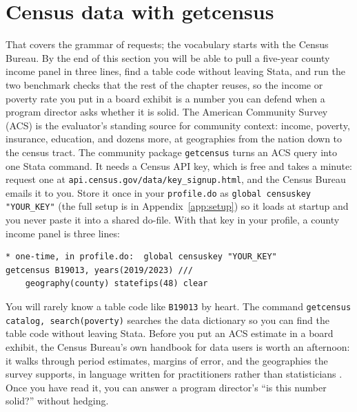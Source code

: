 \documentclass[
    a4paper,
    fontsize=10pt,
    twoside=true,
    numbers=noenddot,
]{kaobook}
\begin{document}
\section{Census data with getcensus}
That covers the grammar of requests; the vocabulary starts with the Census Bureau. By the end of this section you will be able to pull a five-year county income panel in three lines, find a table code without leaving Stata, and run the two benchmark checks that the rest of the chapter reuses, so the income or poverty rate you put in a board exhibit is a number you can defend when a program director asks whether it is solid. The American Community Survey (ACS) is the evaluator's standing source for community context: income, poverty, insurance, education, and dozens more, at geographies from the nation down to the census tract. The community package \texttt{getcensus} turns an ACS query into one Stata command. It needs a Census API key, which is free and takes a minute: request one at \texttt{api.census.gov/data/key\_signup.html}, and the Census Bureau emails it to you. Store it once in your \texttt{profile.do} as \texttt{global censuskey "YOUR\_KEY"} (the full setup is in Appendix~\ref{app:setup}) so it loads at startup and you never paste it into a shared do-file. With that key in your profile, a county income panel is three lines:
\par
{\footnotesize
\begin{verbatim}
* one-time, in profile.do:  global censuskey "YOUR_KEY"
getcensus B19013, years(2019/2023) ///
    geography(county) statefips(48) clear
\end{verbatim}
}
You will rarely know a table code like \texttt{B19013} by heart. The command \texttt{getcensus catalog, search(poverty)} searches the data dictionary so you can find the table code without leaving Stata. Before you put an ACS estimate in a board exhibit, the Census Bureau's own handbook for data users is worth an afternoon: it walks through period estimates, margins of error, and the geographies the survey supports, in language written for practitioners rather than statisticians \parencite{census2020acs}. Once you have read it, you can answer a program director's \enquote{is this number solid?} without hedging.
\end{document}
